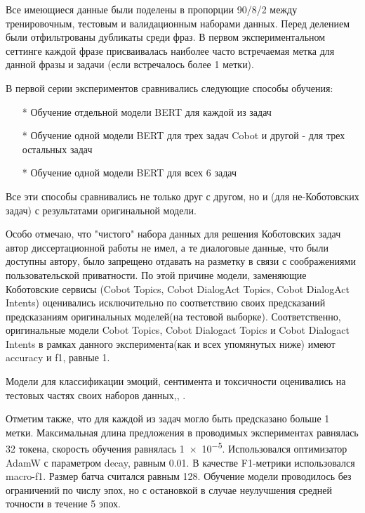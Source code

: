 Все имеющиеся данные были поделены в пропорции 90/8/2 между тренировочным, тестовым и валидационным наборами данных. Перед делением были отфильтрованы дубликаты среди фраз. В первом экспериментальном сеттинге каждой фразе присваивалась наиболее часто встречаемая метка для данной фразы и задачи (если встречалось более 1 метки).

В первой серии экспериментов сравнивались следующие способы обучения:
\begin{itemize}
\item[*] Обучение отдельной модели BERT для каждой из задач
\item[*] Обучение одной модели BERT для трех задач Cobot и другой - для трех остальных задач
\item[*] Обучение одной модели BERT для всех 6 задач
\end{itemize}

Все эти способы сравнивались не только друг с другом, но и (для не-Коботовских задач) с результатами оригинальной модели. 

Особо отмечаю, что "чистого" набора данных для решения Коботовских задач автор диссертационной работы не имел, а те диалоговые данные, что были доступны автору, было запрещено отдавать на разметку в связи с соображениями пользовательской приватности. По этой причине модели, заменяющие Коботовские сервисы (Cobot Topics, Cobot DialogAct Topics, Cobot DialogAct Intents) оценивались исключительно по соответствию своих предсказаний предсказаниям оригинальных моделей(на тестовой выборке). Соответственно, оригинальные модели Cobot Topics, Cobot Dialogact Topics и Cobot Dialogact Intents в рамках данного эксперимента(как и всех упомянутых ниже) имеют accuracy и f1, равные 1.

Модели для классификации эмоций, сентимента и токсичности оценивались на тестовых частях своих наборов данных\cite{sst},\cite{na_website_ndo_emo},\cite{toxic_kaggle} . 


Отметим также, что для каждой из задач могло быть предсказано больше 1 метки.
Максимальная длина предложения в проводимых экспериментах равнялась 32 токена, скорость обучения равнялась \num{1e-5}. Использовался оптимизатор AdamW с параметром decay, равным 0.01. В качестве F1-метрики использовался macro-f1. Размер батча считался равным 128. Обучение модели проводилось без ограничений по числу эпох, но с остановкой в случае неулучшения средней точности в течение 5 эпох.



